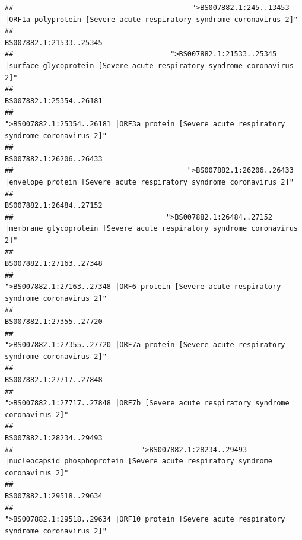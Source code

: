 \documentclass[
]{article}
\begin{document}
\begin{verbatim}
##                                          ">BS007882.1:245..13453 |ORF1a polyprotein [Severe acute respiratory syndrome coronavirus 2]" 
##                                                                                                                BS007882.1:21533..25345 
##                                     ">BS007882.1:21533..25345 |surface glycoprotein [Severe acute respiratory syndrome coronavirus 2]" 
##                                                                                                                BS007882.1:25354..26181 
##                                            ">BS007882.1:25354..26181 |ORF3a protein [Severe acute respiratory syndrome coronavirus 2]" 
##                                                                                                                BS007882.1:26206..26433 
##                                         ">BS007882.1:26206..26433 |envelope protein [Severe acute respiratory syndrome coronavirus 2]" 
##                                                                                                                BS007882.1:26484..27152 
##                                    ">BS007882.1:26484..27152 |membrane glycoprotein [Severe acute respiratory syndrome coronavirus 2]" 
##                                                                                                                BS007882.1:27163..27348 
##                                             ">BS007882.1:27163..27348 |ORF6 protein [Severe acute respiratory syndrome coronavirus 2]" 
##                                                                                                                BS007882.1:27355..27720 
##                                            ">BS007882.1:27355..27720 |ORF7a protein [Severe acute respiratory syndrome coronavirus 2]" 
##                                                                                                                BS007882.1:27717..27848 
##                                                    ">BS007882.1:27717..27848 |ORF7b [Severe acute respiratory syndrome coronavirus 2]" 
##                                                                                                                BS007882.1:28234..29493 
##                              ">BS007882.1:28234..29493 |nucleocapsid phosphoprotein [Severe acute respiratory syndrome coronavirus 2]" 
##                                                                                                                BS007882.1:29518..29634 
##                                            ">BS007882.1:29518..29634 |ORF10 protein [Severe acute respiratory syndrome coronavirus 2]" 

\end{verbatim}
\end{document}
